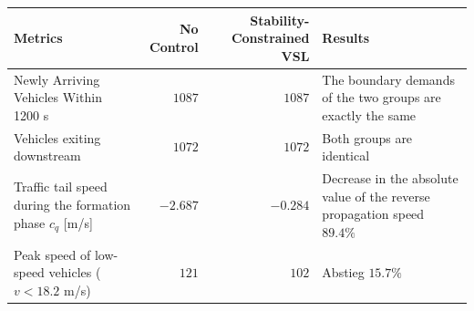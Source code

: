 \documentclass[11pt,a4paper,openany]{book}
\numberwithin{equation}{chapter}
\numberwithin{figure}{chapter}
\numberwithin{table}{chapter}
\begin{document}
\begin{center}
\small
{}
\label{tab:vsl-post-evaluation}
\begin{tabular}{p{4.2cm}rrp{4.4cm}}
\toprule
\textbf{Metrics} & \textbf{No Control} & \textbf{Stability-Constrained VSL} & \textbf{Results} \\
\midrule







Newly Arriving Vehicles Within 1200 s




& $1087$ & $1087$ &




The boundary demands of the two groups are exactly the same



\\







Vehicles exiting downstream




& $1072$ & $1072$ &




Both groups are identical



\\







Traffic tail speed during the formation phase $c_q$ [m/s]




& $-2.687$ & $-0.284$ &




 Decrease in the absolute value of the reverse propagation speed $89.4\%$



\\







Peak speed of low-speed vehicles ($v<18.2$ m/s)& $121$ & $102$ &




 Abstieg $15.7\%$



















\end{tabular}
\end{center}
\end{document}

